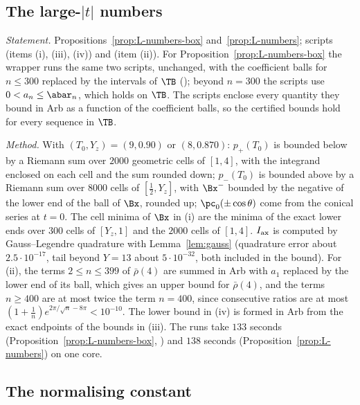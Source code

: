 \subsection{The large-\texorpdfstring{$|t|$}{|t|} numbers}\label{app:cert-L}

\emph{Statement.} Propositions~\ref{prop:L-numbers-box} and~\ref{prop:L-numbers}; scripts  (items (i), (iii), (iv))
and  (item (ii)). For Proposition~\ref{prop:L-numbers-box} the wrapper  runs the same two
scripts, unchanged, with the coefficient balls for $n\le300$ replaced by the intervals of $\TB$ (); beyond $n=300$ the
scripts use $0<a_n\le\abar_n$, which holds on $\TB$. The scripts enclose every quantity they bound in Arb as a function of the coefficient balls,
so the certified bounds hold for every sequence in $\TB$.

\emph{Method.} With $(T_0,Y_z)=(9,0.90)$ or $(8,0.870)$: $p_+(T_0)$ is bounded below by a Riemann sum over $2000$ geometric cells of $[1,4]$, with the
integrand enclosed on each cell and the sum rounded down; $p_-(T_0)$ is bounded above by a Riemann sum over $8000$ cells of $[\frac12,Y_z]$, with
$\Bx^-$ bounded by the negative of the lower end of the ball of $\Bx$, rounded up; $\pc_0(\pm\cos\theta)$ come from the conical series at $t=0$. The
cell minima of $\Bx$ in (i) are the minima of the exact lower ends over $300$ cells of $[Y_z,1]$ and the $2000$ cells of $[1,4]$. $I_{\rm ax}$ is computed by Gauss--Legendre
quadrature with Lemma~\ref{lem:gauss} (quadrature error about $2.5\cdot10^{-17}$, tail beyond $Y=13$ about $5\cdot10^{-32}$, both included in the bound). For (ii), the terms
$2\le n\le399$ of $\bar\rho(4)$ are summed in Arb with $a_1$ replaced by the lower end of its ball, which gives an upper bound for $\bar\rho(4)$, and the terms $n\ge400$ are at most twice the
term $n=400$, since consecutive ratios are at most $(1+\frac1n)e^{2\pi/\sqrt n-8\pi}<10^{-10}$. The lower bound in (iv) is formed in Arb from the exact
endpoints of the bounds in (iii). The runs take $133$ seconds (Proposition~\ref{prop:L-numbers-box}, ) and
$138$ seconds (Proposition~\ref{prop:L-numbers}) on one core.

\subsection{The normalising constant}\label{app:cert-C}

